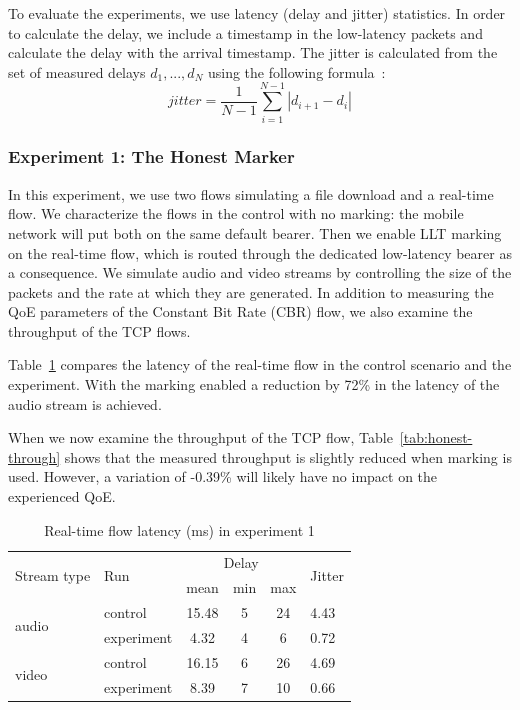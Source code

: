 \documentclass[12pt]{article}
\newcommand{\reftab}[1]{Table~\ref{#1}}
\begin{document}
To evaluate the experiments, we use latency (delay and jitter) statistics.
In order to calculate the delay, we include a timestamp in the low-latency
packets and calculate the delay with the arrival timestamp. The jitter is
calculated from the set of measured delays ${d_1,..., d_N}$
using the following formula~\cite{jitter}:
\begin{equation*}
jitter = \frac{1}{N-1}\sum_{i=1}^{N-1} | d_{i+1} - d_i|
\end{equation*}

\subsubsection{Experiment 1: The Honest Marker}
\label{sec:res-honest}

In this experiment, we use two flows simulating a file download and a real-time
flow. We characterize the flows in the control with no marking: the mobile
network will put both on the same default bearer.  Then we enable LLT marking
on the real-time flow, which is routed through the dedicated low-latency bearer
as a consequence.  We simulate audio and video streams by controlling the size
of the packets and the rate at which they are generated.  In addition to
measuring the QoE parameters of the Constant Bit Rate (CBR) flow, we also
examine the throughput of the TCP flows.

\reftab{tab:honest-lat} compares the latency of the real-time flow in the
control scenario and the experiment. With the marking enabled a reduction by
72\% in the latency of the audio stream is achieved. 

When we now examine the throughput of the TCP flow, \reftab{tab:honest-through}
shows that the measured throughput is slightly reduced when marking is used.
However, a variation of -0.39\% will likely have no impact on the experienced
QoE.

\begin{table}[t]
  \centering
  \label{tab:honest-lat}
  \begin{tabular}{l l c c c l }
    \toprule
    \multirow{2}{*}{Stream type} & \multirow{2}{*}{Run} & \multicolumn{3}{c}{Delay} & \multirow{2}{*}{Jitter} \\
    &  & mean & min & max &  \\
    \midrule
    \multirow{2}{*}{audio} & control & 15.48 & 5 & 24 & 4.43 \\
    & experiment & 4.32 & 4 & 6 & 0.72 \\
    \midrule
    \multirow{2}{*}{video} & control & 16.15 & 6 & 26 & 4.69 \\
    & experiment & 8.39 & 7 & 10 & 0.66 \\
    \bottomrule
  \end{tabular}
  \caption{Real-time flow latency (ms) in experiment 1}
\end{table}
\end{document}
